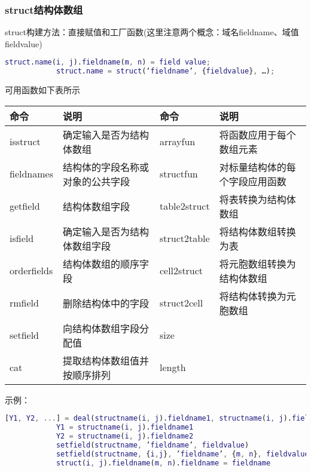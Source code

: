         \subsubsection{struct结构体数组}
            struct构建方法：直接赋值和工厂函数(这里注意两个概念：域名fieldname、域值fieldvalue)
            \begin{lstlisting}[language = Matlab]
            struct.name(i, j).fieldname(m, n) = field value;
            struct.name = struct(‘fieldname’, {fieldvalue}, …);
            \end{lstlisting}
            \par
            可用函数如下表所示
              \begin{table}[H]
                  \centering
                \begin{tabular}{llll}
                  \toprule
                  命令 & 说明&命令 & 说明\\
                  \midrule
            isstruct & 确定输入是否为结构体数组&arrayfun  &  将函数应用于每个数组元素\\
            fieldnames & 结构体的字段名称或对象的公共字段&structfun  & 对标量结构体的每个字段应用函数\\
            getfield & 结构体数组字段&table2struct & 将表转换为结构体数组\\
            isfield &确定输入是否为结构体数组字段&struct2table & 将结构体数组转换为表\\
            orderfields  & 结构体数组的顺序字段&cell2struct &将元胞数组转换为结构体数组\\
            rmfield  & 删除结构体中的字段&struct2cell &将结构体转换为元胞数组\\
            setfield  &  向结构体数组字段分配值&size & {}\\
            cat &提取结构体数组值并按顺序排列&length & {} \\
                  \bottomrule
                \end{tabular}
              \end{table}
            示例：
            \begin{lstlisting}[language=Matlab]
            [Y1, Y2, ...] = deal(structname(i, j).fieldname1, structname(i, j).fieldname2, ...)
            Y1 = structname(i, j).fieldname1
            Y2 = structname(i, j).fieldname2
            setfield(structname, ’fieldname’, fieldvalue)
            setfield(structname, {i,j}, ’fieldname’, {m, n}, fieldvalue)
            struct(i, j).fieldname(m, n).fieldname = fieldname
            \end{lstlisting}
